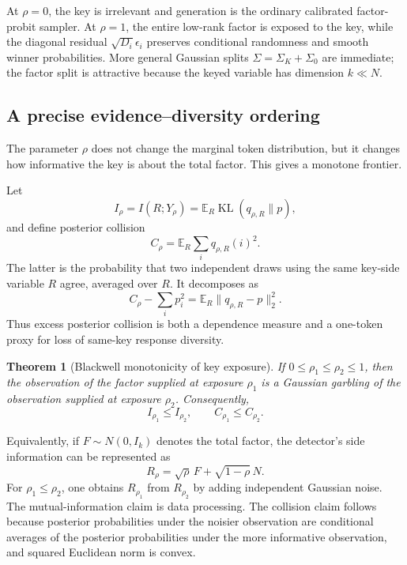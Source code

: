 \documentclass[11pt]{article}
\newtheorem{theorem}{Theorem}[section]
\theoremstyle{definition}
\theoremstyle{remark}
\DeclareMathOperator{\KL}{KL}
\newcommand{\E}{\mathbb{E}}
\begin{document}
At $\rho=0$, the key is irrelevant and generation is the ordinary calibrated factor-probit sampler. At $\rho=1$, the entire low-rank factor is exposed to the key, while the diagonal residual $\sqrt{D_i}\epsilon_i$ preserves conditional randomness and smooth winner probabilities. More general Gaussian splits $\Sigma=\Sigma_K+\Sigma_0$ are immediate; the factor split is attractive because the keyed variable has dimension $k\ll N$.

\subsection{A precise evidence--diversity ordering}

The parameter $\rho$ does not change the marginal token distribution, but it changes how informative the key is about the total factor. This gives a monotone frontier.

Let
\begin{equation}
I_\rho=I(R;Y_\rho)
=\E_R\KL(q_{\rho,R}\|p),
\label{eq:rho-mi}
\end{equation}
and define posterior collision
\begin{equation}
C_\rho=\E_R\sum_i q_{\rho,R}(i)^2.
\label{eq:posterior-collision}
\end{equation}
The latter is the probability that two independent draws using the same key-side variable $R$ agree, averaged over $R$. It decomposes as
\begin{equation}
C_\rho-\sum_i p_i^2
=\E_R\|q_{\rho,R}-p\|_2^2.
\label{eq:collision-excess}
\end{equation}
Thus excess posterior collision is both a dependence measure and a one-token proxy for loss of same-key response diversity.

\begin{theorem}[Blackwell monotonicity of key exposure]
\label{thm:blackwell}
If $0\le\rho_1\le\rho_2\le1$, then the observation of the factor supplied at exposure $\rho_1$ is a Gaussian garbling of the observation supplied at exposure $\rho_2$. Consequently,
\begin{equation}
I_{\rho_1}\le I_{\rho_2},
\qquad
C_{\rho_1}\le C_{\rho_2}.
\label{eq:blackwell-monotonicity}
\end{equation}
\end{theorem}

Equivalently, if $F\sim N(0,I_k)$ denotes the total factor, the detector's side information can be represented as
\begin{equation}
R_\rho=\sqrt{\rho}\,F+\sqrt{1-\rho}\,N.
\label{eq:observation-channel}
\end{equation}
For $\rho_1\le\rho_2$, one obtains $R_{\rho_1}$ from $R_{\rho_2}$ by adding independent Gaussian noise. The mutual-information claim is data processing. The collision claim follows because posterior probabilities under the noisier observation are conditional averages of the posterior probabilities under the more informative observation, and squared Euclidean norm is convex.
\end{document}
